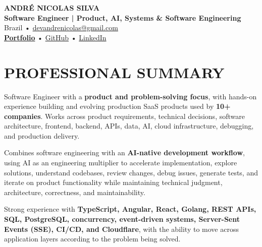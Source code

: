\documentclass[10pt,a4paper]{article}
\begin{document}

\begin{center}

    {\LARGE \textbf{ANDRÉ NICOLAS SILVA}} \\[-2pt]

    {\normalsize \textbf{Software Engineer | Product, AI, Systems \& Software Engineering}} \\[1pt]

    \footnotesize
    Brazil \quad • \quad
    \href{mailto:devandrenicolas@gmail.com}{devandrenicolas@gmail.com} \\[-1pt]

    \textbf{\href{https://portfolio-andrenicolas.vercel.app}{Portfolio}}
    \quad • \quad
    \href{https://github.com/devAndreNicolas}{GitHub}
    \quad • \quad
    \href{https://www.linkedin.com/in/devandrenicolas}{LinkedIn}

\end{center}

\vspace{-3pt}


\section*{PROFESSIONAL SUMMARY}

\footnotesize

Software Engineer with a \textbf{product and problem-solving focus},
with hands-on experience building and evolving production SaaS
products used by \textbf{10+ companies}. Works across product
requirements, technical decisions, software architecture, frontend,
backend, APIs, data, AI, cloud infrastructure, debugging, and
production delivery.

Combines software engineering with an \textbf{AI-native development
workflow}, using AI as an engineering multiplier to accelerate
implementation, explore solutions, understand codebases, review
changes, debug issues, generate tests, and iterate on product
functionality while maintaining technical judgment, architecture,
correctness, and maintainability.

Strong experience with \textbf{TypeScript, Angular, React, Golang,
REST APIs, SQL, PostgreSQL, concurrency, event-driven systems,
Server-Sent Events (SSE), CI/CD, and Cloudflare}, with the ability
to move across application layers according to the problem being
solved.
\end{document}
